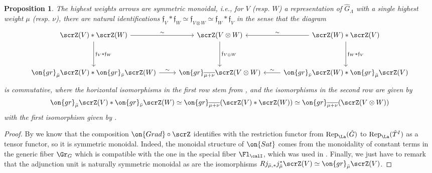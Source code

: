 \documentclass[10pt, reqno]{amsart}
\theoremstyle{plain}
\newtheorem{proposition}[theorem]{Proposition}
\theoremstyle{definition}
\numberwithin{equation}{section}
\begin{document}
	\begin{proposition}
		The highest weights arrows are symmetric monoidal, i.e., for $V$ (resp. $W$) a representation of $\hat{G}_{\Lambda}$ with a single highest weight $\mu$ (resp. $\nu$),  there are natural identifications $\mathfrak{f}_{V} \ast \mathfrak{f}_{W} \simeq \mathfrak{f}_{V\otimes W} \simeq \mathfrak{f}_{W} \ast \mathfrak{f}_{V}$ in the sense that the diagram
		\begin{equation}
			\begin{tikzcd}[row sep=huge]
				\scrZ(V) * \scrZ(W) \arrow[r,"\sim"]	
				\arrow[d,"\mathfrak{f}_V *\mathfrak{f}_W"]
				&
				\scrZ(V\otimes W)
				\arrow[d,"\mathfrak{f}_{V\otimes W}"]
				&
				\scrZ(W) * \scrZ(V)
				\arrow[l,"\sim"']
				\arrow[d,"\mathfrak{f}_W *\mathfrak{f}_V"]
				\\
				\on{gr}_{\bar \mu} \scrZ(V)	* \on{gr}_{\bar \nu} \scrZ(W)
				\arrow[r,"\sim"]
				&
				\on{gr}_{\overline{ \mu +\nu}} \scrZ(V\otimes W)
				&
				\on{gr}_{\bar \nu} \scrZ(W)	* \on{gr}_{\bar \mu} \scrZ(V)
				\arrow[l,"\sim"']
			\end{tikzcd}
		\end{equation}
		is commutative, 
		where the horizontal isomorphisms in the first row stem from , and the isomorphisms in the second row are given by 
		\begin{equation}
			\on{gr}_{\bar \mu} \scrZ(V)	* \on{gr}_{\bar \nu} \scrZ(W)
			\simeq 
			\on{gr}_{\overline{ \mu+\nu}}( \scrZ(V)	*  \scrZ(W))
			\simeq 
			\on{gr}_{\overline{ \mu+\nu}}( \scrZ(V\otimes W))
		\end{equation}
		with the first isomorphism given by . 
	\end{proposition}
	
	\begin{proof}
		By   we know that the composition $\on{Grad} \circ \scrZ$ identifies with the restriction functor from $\mathrm{Rep}_\La (\hat{G})$ to $\mathrm{Rep}_\La (\hat{T}^I)$ as a tensor functor, so it is symmetric monoidal. Indeed, the monoidal structure of $\on{Sat}$ comes from the monoidality of constant terms in the generic fiber $\Gr_G$ which is compatible with the one in the special fiber $\Fl_{\calI}$, which was used in . Finally, we just have to remark that the adjunction unit is naturally symmetric monoidal as are the isomorphisms $Rj_{\bar \mu,*}j^*_{\bar \mu} \scrZ(V)\simeq \on{gr}_{\bar \mu} \scrZ(V)$.
	\end{proof}
	
\end{document}
